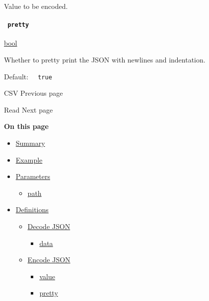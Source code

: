 Value to be encoded.

\paragraph{\texorpdfstring{\texttt{\ pretty\ }}{ pretty }}\label{definitions-encode-pretty}

\href{/docs/reference/foundations/bool/}{bool}

Whether to pretty print the JSON with newlines and indentation.

Default: \texttt{\ }{\texttt{\ true\ }}\texttt{\ }

\href{/docs/reference/data-loading/csv/}{\pandocbounded{}}

{ CSV } { Previous page }

\href{/docs/reference/data-loading/read/}{\pandocbounded{}}

{ Read } { Next page }

\textbf{On this page}

\begin{itemize}
\tightlist
\item
  \hyperref[summary]{Summary}
\item
  \hyperref[example]{Example}
\item
  \hyperref[parameters]{Parameters}

  \begin{itemize}
  \tightlist
  \item
    \hyperref[parameters-path]{path}
  \end{itemize}
\item
  \hyperref[definitions]{Definitions}

  \begin{itemize}
  \tightlist
  \item
    \hyperref[definitions-decode]{Decode JSON}

    \begin{itemize}
    \tightlist
    \item
      \hyperref[definitions-decode-data]{data}
    \end{itemize}
  \item
    \hyperref[definitions-encode]{Encode JSON}

    \begin{itemize}
    \tightlist
    \item
      \hyperref[definitions-encode-value]{value}
    \item
      \hyperref[definitions-encode-pretty]{pretty}
    \end{itemize}
  \end{itemize}
\end{itemize}

